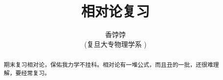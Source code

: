 \documentclass[12pt,a4paper]{article}%
\title{\fontsize{18pt}{27pt}\selectfont%
	{\heiti%
		相对论复习}}%
\author{\fontsize{12pt}{18pt}\selectfont%
	{\fangsong%
		香饽饽}\\%
	\fontsize{10.5pt}{15.75pt}\selectfont%
	{\fangsong%
		(复旦大专物理学系
		)}}%
\date{}%
\begin{document}
	\maketitle%
	\lhead{}%
	\chead{}%
	\rhead{}%
	\lfoot{}%
	\cfoot{\thepage}%
	\rfoot{}%
	\begin{abstract}
	\fangsong 期末复习相对论，保佑我力学不挂科。相对论有一堆公式，而且丑的一批，还很难理解，要经常复习。
	\end{abstract}
	
	\begin{adjustwidth}{1.06cm}{1.06cm}
	\fontsize{10.5pt}{15.75pt}\\
	\end{adjustwidth}
	
	
	\newpage%
	
	\renewcommand{\contentsname}{目录}
	\tableofcontents
	\newpage
	
\end{document}
